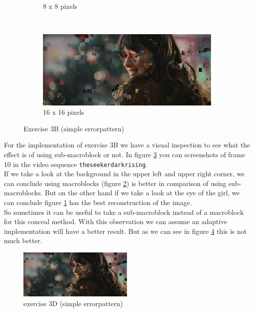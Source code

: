 \documentclass[a4paper,11pt,oneside]{article}
\begin{document}
\begin{figure}[H]
\begin{subfigure}[h]{0.5\textwidth}
                \caption{8 x 8 pixels}\label{subfig:8}
        \end{subfigure}
        ~
        \begin{subfigure}[h]{0.5\textwidth}
                \includegraphics[width=\textwidth]{img/3B_16.png}
                \caption{16 x 16 pixels}\label{subfig:16}
        \end{subfigure}
        \caption{Exercise 3B (simple errorpattern)}\label{fig:ex3B}
\end{figure}
\vspace{-0.5cm}
For the implementation of exercise 3B we have a visual inspection to see what the effect is of using sub-macroblock or not. In figure \ref{fig:ex3B} you can screenshots of frame 10 in  the video sequence \verb!theseekerdarkrising!.\\
If we take a look at the background in the upper left and upper right corner, we can conclude using macroblocks (figure \ref{subfig:16}) is better in comparison of using sub-macroblocks. But on the other hand if we take a look at the eye of the girl, we can conclude figure \ref{subfig:8} has the best reconstruction of the image.\\
So sometimes it can be useful to take a sub-macroblock instead of a macroblock for this conceal method. With this observation we can assume an adaptive implementation will have a better result. But as we can see in figure \ref{fig:3D_simple} this is not much better.
\begin{figure}[H]
\centering
\includegraphics[width=0.5\textwidth]{img/3D_simple.png}
\caption{exercise 3D (simple errorpattern)}\label{fig:3D_simple}
\end{figure}
\vspace{-1cm}
\end{document}
